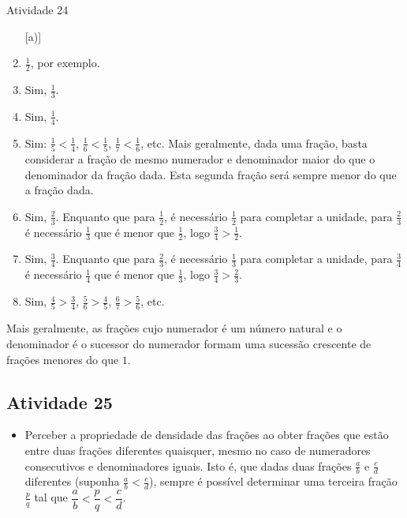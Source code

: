 \begin{multicols}{2}
\begin{resposta*}{Atividade 24}
\begin{enumerate} [\quad a)] %
    \item             $\frac{1}{2}$, por exemplo.
    \item       Sim,       $\frac{1}{3}$.
    \item       Sim,       $\frac{1}{4}$. 
    \item       Sim:       $\frac{1}{5} < \frac{1}{4}$,       $\frac{1}{6} < 
\frac{1}{5}$,       $\frac{1}{7} < \frac{1}{6}$, etc. Mais geralmente, dada uma 
fração, basta considerar a fração de mesmo numerador e denominador maior do que 
o denominador da fração dada. Esta segunda fração será sempre menor do que a 
fração dada.
    \item       Sim,       $\frac{2}{3}$. Enquanto que para       $\frac{1}{2}$, 
é necessário       $\frac{1}{2}$       para completar a unidade, para       
$\frac{2}{3}$       é necessário       $\frac{1}{3}$       que é menor que       
$\frac{1}{2}$, logo       $\frac{3}{4} > \frac{1}{2}$.
    \item       Sim,       $\frac{3}{4}$. Enquanto que para       $\frac{2}{3}$, 
é necessário       $\frac{1}{3}$       para completar a unidade, para       
$\frac{3}{4}$       é necessário       $\frac{1}{4}$       que é menor que       
$\frac{1}{3}$, logo       $\frac{3}{4} > \frac{2}{3}$.
    \item       Sim,       $\frac{4}{5} > \frac{3}{4}$,       $\frac{5}{6} > 
\frac{4}{5}$,       $\frac{6}{7} > \frac{5}{6}$, etc.
\end{enumerate} %
  
  Mais geralmente, as frações cujo numerador é um número natural e o denominador 
é o sucessor do numerador formam uma sucessão crescente de frações menores do 
que   $1$.  
  
\end{resposta*}



\subsection{Atividade 25}

\begin{itemize} %
    \item       Perceber a propriedade de densidade das frações ao obter frações 
que estão entre duas frações diferentes quaisquer, mesmo no caso de numeradores 
consecutivos e denominadores iguais. Isto é, que dadas duas frações       
$\frac{a}{b}$       e       $\frac{c}{d}$       diferentes (suponha       
$\frac{a}{b}<\frac{c}{d}$), sempre é possível determinar uma terceira fração     
  $\frac{p}{q}$       tal que       $\dfrac{a}{b}<\dfrac{p}{q}<\dfrac{c}{d}$.
\end{itemize} %
  

\end{multicols}
